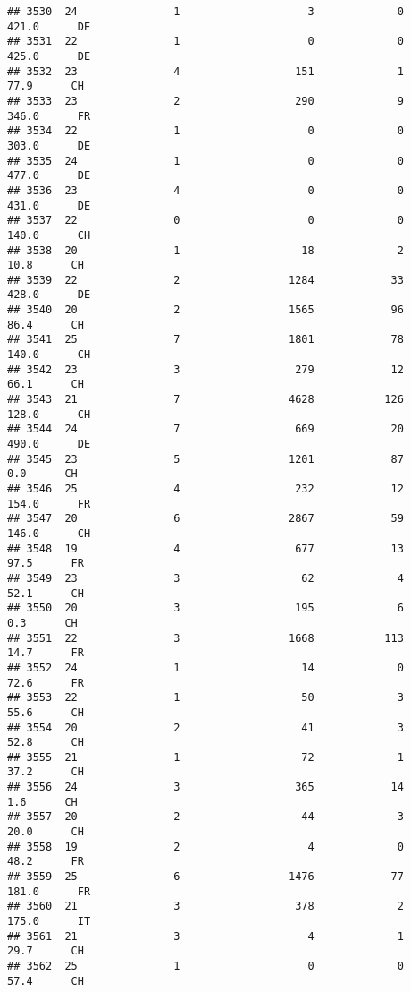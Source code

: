 \documentclass[
]{article}
\begin{document}
\begin{verbatim}
## 3530  24               1                    3             0    421.0      DE
## 3531  22               1                    0             0    425.0      DE
## 3532  23               4                  151             1     77.9      CH
## 3533  23               2                  290             9    346.0      FR
## 3534  22               1                    0             0    303.0      DE
## 3535  24               1                    0             0    477.0      DE
## 3536  23               4                    0             0    431.0      DE
## 3537  22               0                    0             0    140.0      CH
## 3538  20               1                   18             2     10.8      CH
## 3539  22               2                 1284            33    428.0      DE
## 3540  20               2                 1565            96     86.4      CH
## 3541  25               7                 1801            78    140.0      CH
## 3542  23               3                  279            12     66.1      CH
## 3543  21               7                 4628           126    128.0      CH
## 3544  24               7                  669            20    490.0      DE
## 3545  23               5                 1201            87      0.0      CH
## 3546  25               4                  232            12    154.0      FR
## 3547  20               6                 2867            59    146.0      CH
## 3548  19               4                  677            13     97.5      FR
## 3549  23               3                   62             4     52.1      CH
## 3550  20               3                  195             6      0.3      CH
## 3551  22               3                 1668           113     14.7      FR
## 3552  24               1                   14             0     72.6      FR
## 3553  22               1                   50             3     55.6      CH
## 3554  20               2                   41             3     52.8      CH
## 3555  21               1                   72             1     37.2      CH
## 3556  24               3                  365            14      1.6      CH
## 3557  20               2                   44             3     20.0      CH
## 3558  19               2                    4             0     48.2      FR
## 3559  25               6                 1476            77    181.0      FR
## 3560  21               3                  378             2    175.0      IT
## 3561  21               3                    4             1     29.7      CH
## 3562  25               1                    0             0     57.4      CH

\end{verbatim}
\end{document}
